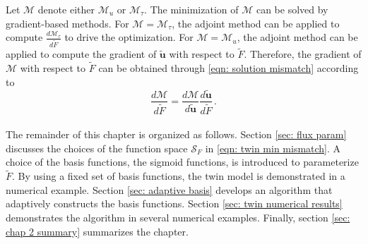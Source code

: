 

Let $\mathcal{M}$ denote either $\mathcal{M}_u$
or $\mathcal{M}_{\tau}$.
The minimization of $\mathcal{M}$ can be solved by gradient-based methods.
For $\mathcal{M}=\mathcal{M}_{\tau}$, the adjoint method can be applied to compute 
$\frac{d\mathcal{M}_{\tau}}{d\tilde{F}}$ to drive the optimization.
For $\mathcal{M} = \mathcal{M}_u$, the adjoint method can be 
applied to compute the gradient of $\tilde{\boldsymbol{u}}$ with respect
to $\tilde{F}$. Therefore, the gradient of $\mathcal{M}$ with respect to $\tilde{F}$ can be 
obtained through 
\eqref{eqn: solution mismatch} according to
\begin{equation}
    \frac{d\mathcal{M}}{d\tilde{F}} = \frac{d\mathcal{M}}{d\tilde{\boldsymbol{u}}} \frac{d\tilde{\boldsymbol{u}}}{d\tilde{F}}\,.
    \label{eqn: estimated gradient temp}
\end{equation}\\


The remainder of this chapter is organized as follows.
Section \ref{sec: flux param} discusses the choices of the function space $\mathcal{S}_F$
in \eqref{eqn: twin min mismatch}.
A choice of the basis functions, the sigmoid functions, 
is introduced to parameterize $\tilde{F}$. By using a fixed set of basis functions, the 
twin model is demonstrated in a numerical example.
Section \ref{sec: adaptive basis} develops an algorithm that adaptively constructs the
basis functions.
Section \ref{sec: twin numerical results} demonstrates the algorithm in several numerical examples.
Finally, section \ref{sec: chap 2 summary} summarizes the chapter.\\



